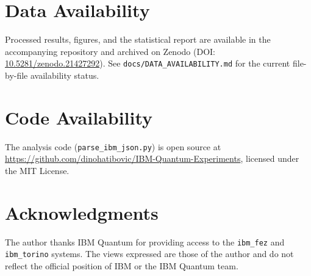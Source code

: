 \documentclass[11pt]{article}
\begin{document}
\section*{Data Availability}
Processed results, figures, and the statistical report are available in
the accompanying repository and archived on Zenodo (DOI:
\href{https://doi.org/10.5281/zenodo.21427292}{10.5281/zenodo.21427292}).
See \texttt{docs/DATA\_AVAILABILITY.md} for the current file-by-file
availability status.

\section*{Code Availability}
The analysis code (\texttt{parse\_ibm\_json.py}) is open source at
\url{https://github.com/dinohatibovic/IBM-Quantum-Experiments}, licensed
under the MIT License.

\section*{Acknowledgments}
The author thanks IBM Quantum for providing access to the
\texttt{ibm\_fez} and \texttt{ibm\_torino} systems. The views expressed are
those of the author and do not reflect the official position of IBM or the
IBM Quantum team.



\end{document}
